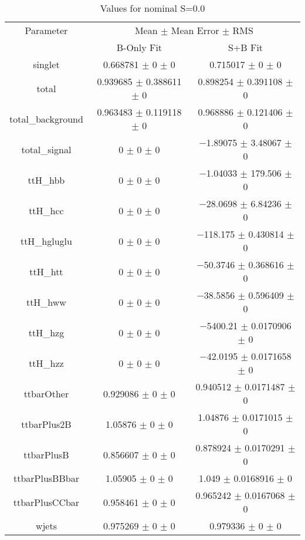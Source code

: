\begin{table}
\centering
\caption{Values for nominal S=0.0}
\begin{tabular}{ccc}
\toprule
Parameter & \multicolumn{2}{c}{Mean $\pm$ Mean Error $\pm$ RMS}\\
 & B-Only Fit & S+B Fit\\
\midrule
singlet & \num{0.668781} $\pm$ \num{0} $\pm$ \num{0} & \num{0.715017} $\pm$ \num{0} $\pm$ \num{0}\\
total & \num{0.939685} $\pm$ \num{0.388611} $\pm$ \num{0} & \num{0.898254} $\pm$ \num{0.391108} $\pm$ \num{0}\\
total\_background & \num{0.963483} $\pm$ \num{0.119118} $\pm$ \num{0} & \num{0.968886} $\pm$ \num{0.121406} $\pm$ \num{0}\\
total\_signal & \num{0} $\pm$ \num{0} $\pm$ \num{0} & \num{-1.89075} $\pm$ \num{3.48067} $\pm$ \num{0}\\
ttH\_hbb & \num{0} $\pm$ \num{0} $\pm$ \num{0} & \num{-1.04033} $\pm$ \num{179.506} $\pm$ \num{0}\\
ttH\_hcc & \num{0} $\pm$ \num{0} $\pm$ \num{0} & \num{-28.0698} $\pm$ \num{6.84236} $\pm$ \num{0}\\
ttH\_hgluglu & \num{0} $\pm$ \num{0} $\pm$ \num{0} & \num{-118.175} $\pm$ \num{0.430814} $\pm$ \num{0}\\
ttH\_htt & \num{0} $\pm$ \num{0} $\pm$ \num{0} & \num{-50.3746} $\pm$ \num{0.368616} $\pm$ \num{0}\\
ttH\_hww & \num{0} $\pm$ \num{0} $\pm$ \num{0} & \num{-38.5856} $\pm$ \num{0.596409} $\pm$ \num{0}\\
ttH\_hzg & \num{0} $\pm$ \num{0} $\pm$ \num{0} & \num{-5400.21} $\pm$ \num{0.0170906} $\pm$ \num{0}\\
ttH\_hzz & \num{0} $\pm$ \num{0} $\pm$ \num{0} & \num{-42.0195} $\pm$ \num{0.0171658} $\pm$ \num{0}\\
ttbarOther & \num{0.929086} $\pm$ \num{0} $\pm$ \num{0} & \num{0.940512} $\pm$ \num{0.0171487} $\pm$ \num{0}\\
ttbarPlus2B & \num{1.05876} $\pm$ \num{0} $\pm$ \num{0} & \num{1.04876} $\pm$ \num{0.0171015} $\pm$ \num{0}\\
ttbarPlusB & \num{0.856607} $\pm$ \num{0} $\pm$ \num{0} & \num{0.878924} $\pm$ \num{0.0170291} $\pm$ \num{0}\\
ttbarPlusBBbar & \num{1.05905} $\pm$ \num{0} $\pm$ \num{0} & \num{1.049} $\pm$ \num{0.0168916} $\pm$ \num{0}\\
ttbarPlusCCbar & \num{0.958461} $\pm$ \num{0} $\pm$ \num{0} & \num{0.965242} $\pm$ \num{0.0167068} $\pm$ \num{0}\\
wjets & \num{0.975269} $\pm$ \num{0} $\pm$ \num{0} & \num{0.979336} $\pm$ \num{0} $\pm$ \num{0}\\
\bottomrule
\end{tabular}
\end{table}